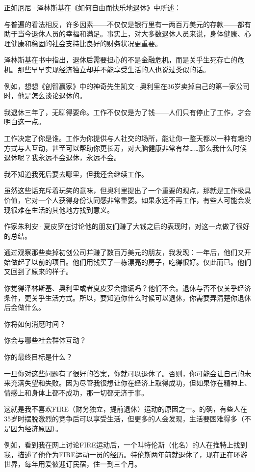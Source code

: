 正如厄尼·泽林斯基在《如何自由而快乐地退休》中所述：

与普遍的看法相反，许多因素——不仅仅是银行里有一两百万美元的存款——都有助于当今退休人员的幸福和满足。事实上，对大多数退休人员来说，身体健康、心理健康和稳固的社会支持比良好的财务状况更重要。

泽林斯基在书中指出，退休后需要担心的不是金融危机，而是关乎生死存亡的危机。那些早早实现经济独立却并不能享受生活的人也说过类似的话。

例如，想想《创智赢家》中的神奇先生凯文·奥利里在36岁卖掉自己的第一家公司时，他是怎么谈论退休的。

我退休三年了，无聊得要命。工作不仅仅是为了钱——人们只有停止了工作，才会明白这一点。

工作决定了你是谁。工作为你提供与人社交的场所，能让你一整天都以一种有趣的方式与人互动，甚至可以帮助你更长寿，对大脑健康非常有益……那么我什么时候退休呢？我永远不会退休，永远不会。

我不知道我死后要去哪里，但我还会继续工作。

虽然这些话充斥着玩笑的意味，但奥利里提出了一个重要的观点，那就是工作极具价值，它对一个人获得身份认同感非常重要。如果永远不再工作，有些人可能会发现很难在生活的其他地方找到意义。

作家朱利安·夏皮罗在讨论他的朋友们赚了大钱之后的表现时，对这一点做了很好的总结。

通过观察那些卖掉初创公司并赚了数百万美元的朋友，我发现：一年后，他们又开始做起了以前的项目。他们用钱买了一栋漂亮的房子，吃得很好。仅此而已。他们又回到了原来的样子。

你觉得泽林斯基、奥利里或者夏皮罗会撒谎吗？他们不会。退休与否不仅关乎经济条件，更关乎生活方式。所以，要知道你什么时候可以退休，你需要弄清楚你退休后会做什么。

你将如何消磨时间？

你会与哪些社会群体互动？

你的最终目标是什么？

一旦你对这些问题有了很好的答案，你就可以退休了。否则，你可能会让自己的未来充满失望和失败。因为尽管我很想让你在经济上取得成功，但如果你在精神上、情感上和身体上都不成功，那一切都无济于事。

这就是我不喜欢FIRE（财务独立，提前退休）运动的原因之一。的确，有些人在35岁时摆脱激烈的竞争后可以享受生活，但更多的人会发现，生活要困难得多（不是因为经济原因）。

例如，看到我在网上讨论FIRE运动后，一个叫特伦斯（化名）的人在推特上找到我，描述了他作为FIRE运动一员的经历。特伦斯两年前就退休了，现在正在环游世界，每年用爱彼迎订民宿，住一到三个月。

